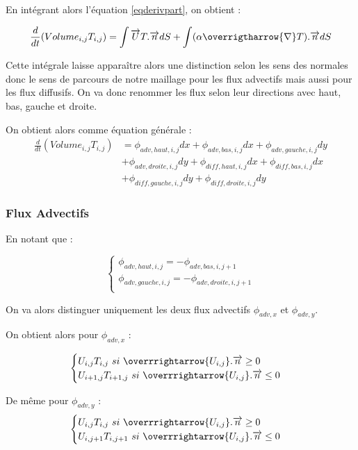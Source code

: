 \documentclass[a4paper,oneside]{article}
\begin{document}
En intégrant alors l'équation \ref{eqderivpart}, on obtient :

\[
\frac{d}{dt} (Volume_{i,j} T_{i,j})= \int \overrightarrow{U}T.\overrightarrow{n} dS + \int (\alpha\overrigtharrow{\nabla} T).\overrightarrow{n} dS
\]

Cette intégrale laisse apparaître alors une distinction selon les sens des normales donc le sens de parcours de notre maillage pour les flux advectifs mais aussi pour les flux diffusifs.
On va donc renommer les flux selon leur directions avec haut, bas, gauche et droite.

On obtient alors comme équation générale :
\begin{align*}
\frac{d}{dt} (Volume_{i,j} T_{i,j}) &= \phi_{adv,haut,i,j}dx + \phi_{adv,bas,i,j}dx + \phi_{adv,gauche,i,j}dy  \\
&+ \phi_{adv,droite,i,j}dy + \phi_{diff,haut,i,j}dx + \phi_{diff,bas,i,j}dx  \\
&+ \phi_{diff,gauche,i,j}dy + \phi_{diff,droite,i,j}dy
\end{align*}
\subsubsection{Flux Advectifs}

En notant que :

\begin{equation*}
\begin{cases}
	\phi_{adv,haut,i,j} = -\phi_{adv,bas,i,j+1}\\
	\phi_{adv,gauche,i,j}  = -\phi_{adv,droite,i,j+1}\\
\end{cases}
\end{equation*}

On va alors distinguer uniquement les deux flux advectifs 
$\phi_{adv,x}$ et $\phi_{adv,y}$.

On obtient alors pour $\phi_{adv,x}$ :

\begin{equation*}
\begin{cases}
	U_{i,j}T_{i,j} \ si \ \overrrightarrow{U_{i,j}}.\overrightarrow{n} \geq 0 \\
U_{i+1,j}T_{i+1,j} \ si \ \overrrightarrow{U_{i,j}}.\overrightarrow{n} \leq 0 \\
\end{cases}
\end{equation*}

De même pour $\phi_{adv,y}$ :
\begin{equation*}
\begin{cases}
	U_{i,j}T_{i,j} \ si \ \overrrightarrow{U_{i,j}}.\overrightarrow{n} \geq 0 \\
U_{i,j+1}T_{i,j+1} \ si \ \overrrightarrow{U_{i,j}}.\overrightarrow{n} \leq 0 \\\end{cases}
\end{equation*}
\end{document}
